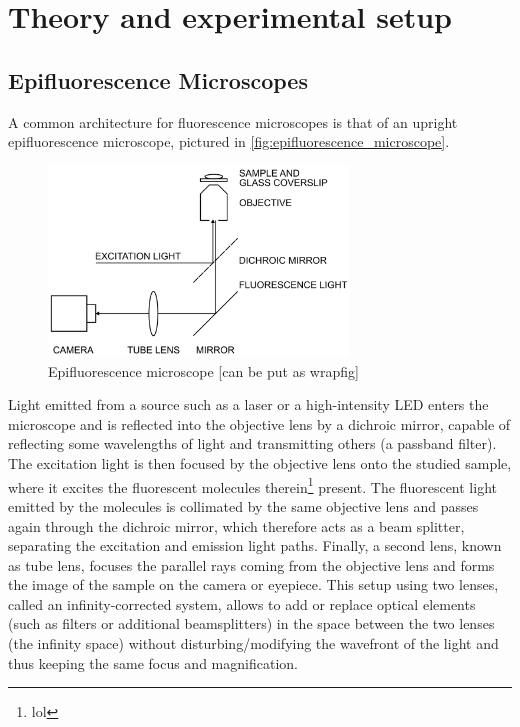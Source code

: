 \section{Theory and experimental setup}

\subsection{Epifluorescence Microscopes}
A common architecture for fluorescence microscopes is that of an upright epifluorescence microscope, pictured in \autoref{fig:epifluorescence_microscope}.

\begin{figure}[htbp]  
    \centering
    \includegraphics[width=8cm]{figures/epifluorescence-microscope.png}
    \caption{Epifluorescence microscope \cite{douglass_notice_2023} [can be put as wrapfig]}
    \label{fig:epifluorescence_microscope}
\end{figure}

Light emitted from a source such as a laser or a high-intensity LED enters the microscope and is reflected into the objective lens by a dichroic mirror, capable of reflecting some wavelengths of light and transmitting others (a passband filter)\cite{douglass_notice_2023}.
The excitation light is then focused by the objective lens onto the studied sample, where it excites the fluorescent molecules therein\footnote{lol} present.
The fluorescent light emitted by the molecules is collimated by the same objective lens and passes again through the dichroic mirror, which therefore acts as a beam splitter, separating the excitation and emission light paths\cite{sachl_introduction_2022}.
Finally, a second lens, known as tube lens, focuses the parallel rays coming from the objective lens and forms the image of the sample on the camera or eyepiece.
This setup using two lenses, called an infinity-corrected system, allows to add or replace optical elements (such as filters or additional beamsplitters) in the space between the two lenses (the infinity space) without disturbing/modifying the wavefront of the light and thus keeping the same focus and magnification.


